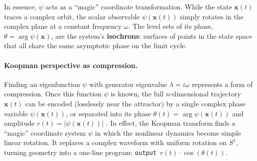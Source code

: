 
In essence, $\psi$ acts as a ``magic'' coordinate transformation. While the state $\mathbf{x}(t)$ traces a complex orbit, the scalar observable $\psi(\mathbf{x}(t))$ simply rotates in the complex plane at a constant frequency $\omega$. The level sets of its phase, $\theta = \arg \psi(\mathbf{x})$, are the system's \textbf{isochrons}: surfaces of points in the state space that all share the same asymptotic phase on the limit cycle.

\paragraph{Koopman perspective as compression.}
Finding an eigenfunction $\psi$ with generator eigenvalue $ \lambda=i\omega$ represents a form of compression. Once this function $\psi$ is known, the full $n$‑dimensional trajectory $\mathbf x(t)$ can be encoded (losslessly near the attractor) by a single complex phase variable $\psi(\mathbf{x}(t))$, or separated into its phase $\theta(t)=\arg\psi(\mathbf x(t))$ and amplitude $r(t)=|\psi(\mathbf x(t))|$ \cite{Koopman31}. In effect, the Koopman transform finds a ``magic'' coordinate system $\psi$ in which the nonlinear dynamics become simple linear rotation. It replaces a complex waveform with uniform rotation on $S^{1}$, turning geometry into a one‑line program: \texttt{output $r(t) \cdot \cos(\theta(t))$}.



